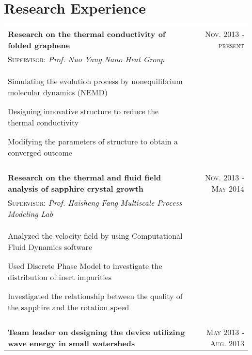 \documentclass[a4paper,10pt]{article}
\begin{document}
\section{Research Experience}
\begin{tabular}{p{14cm}r}
\textbf{Research on the thermal conductivity of folded graphene}  &\textsc{Nov. 2013} - \textsc{present} \\
\hspace{1em}\textsc{Supervisor:} \emph{Prof. Nuo Yang \hspace{19em}} \emph{Nano Heat Group} & \vspace{-0.5em}\\
\begin{compactitem}
       \item Simulating the evolution process by nonequilibrium molecular dynamics (NEMD)
       \item Designing innovative structure to reduce the thermal conductivity
       \item Modifying the parameters of structure to obtain a converged outcome
     \end{compactitem}&\vspace{-1em} \\
\multicolumn{2}{c}{} \\
\textbf{Research on the thermal and fluid field analysis of sapphire crystal growth}  &\textsc{Nov. 2013 - May 2014} \\
\hspace{1em} \textsc{Supervisor:} \emph{Prof. Haisheng Fang} \hspace{10em} \emph{Multiscale Process Modeling Lab}  & \vspace{-0.5em} \\
\begin{compactitem}
       \item Analyzed the velocity field by using Computational Fluid Dynamics software
       \item Used Discrete Phase Model to investigate the distribution of inert impurities
       \item Investigated the relationship between the quality of the sapphire and the rotation speed
     \end{compactitem}&\vspace{-1em} \\
\multicolumn{2}{c}{} \\
 \textbf{Team leader on designing the device utilizing wave energy in small watersheds}  &\textsc{May 2013 - Aug. 2013} \\

\end{tabular}
\end{document}
